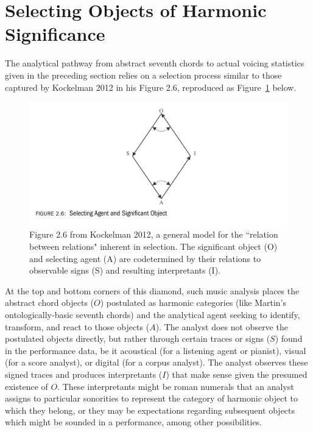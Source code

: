 \section{Selecting Objects of Harmonic Significance}
The analytical pathway from abstract seventh chords to actual voicing statistics given in the preceding section relies on a selection process similar to those captured by Kockelman 2012 in his Figure 2.6, reproduced as Figure~\ref{kockelman} below. 

\begin{figure}[h]
	\centering
	\includegraphics[width=6in]{kockelman_model.jpg}
	\caption{Figure 2.6 from Kockelman 2012, a general model for the ``relation between relations" inherent in selection.  The significant object (O) and selecting agent (A) are codetermined by their relations to observable signs (S) and resulting interpretants (I).}
	\label{kockelman}
\end{figure}

At the top and bottom corners of this diamond, such music analysis places the abstract chord objects ($O$) postulated as harmonic categories (like Martin's ontologically-basic seventh chords) and the analytical agent seeking to identify, transform, and react to those objects ($A$).  The analyst does not observe the postulated objects directly, but rather through certain traces or signs ($S$) found in the performance data, be it acoustical (for a listening agent or pianist), visual (for a score analyst), or digital (for a corpus analyst).  The analyst observes these signed traces and produces interpretants ($I$) that make sense given the presumed existence of $O$.  These interpretants might be roman numerals that an analyst assigns to particular sonorities to represent the category of harmonic object to which they belong, or they may be expectations regarding subsequent objects which might be sounded in a performance, among other possibilities.

